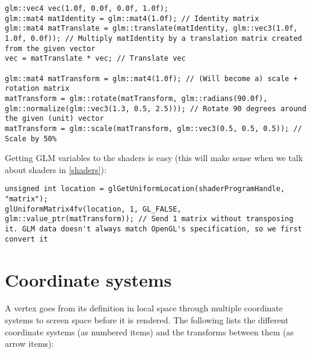 \documentclass[8pt, table, xcdraw]{article}%
\begin{document}
\begin{lstlisting}
glm::vec4 vec(1.0f, 0.0f, 0.0f, 1.0f);
glm::mat4 matIdentity = glm::mat4(1.0f); // Identity matrix
glm::mat4 matTranslate = glm::translate(matIdentity, glm::vec3(1.0f, 1.0f, 0.0f)); // Multiply matIdentity by a translation matrix created from the given vector
vec = matTranslate * vec; // Translate vec

glm::mat4 matTransform = glm::mat4(1.0f); // (Will become a) scale + rotation matrix
matTransform = glm::rotate(matTransform, glm::radians(90.0f), glm::normalize(glm::vec3(1.3, 0.5, 2.5))); // Rotate 90 degrees around the given (unit) vector
matTransform = glm::scale(matTransform, glm::vec3(0.5, 0.5, 0.5)); // Scale by 50%
\end{lstlisting}

Getting GLM variables to the shaders is easy (this will make sense when we talk about shaders in \ref{shaders}):

\begin{lstlisting}
unsigned int location = glGetUniformLocation(shaderProgramHandle, "matrix");
glUniformMatrix4fv(location, 1, GL_FALSE, glm::value_ptr(matTransform)); // Send 1 matrix without transposing it. GLM data doesn't always match OpenGL's specification, so we first convert it
\end{lstlisting}

\section{Coordinate systems}

A vertex goes from its definition in local space through multiple coordinate systems to screen space before it is rendered. The following lists the different coordinate systems (as numbered items) and the transforms between them (as arrow items):
\end{document}
